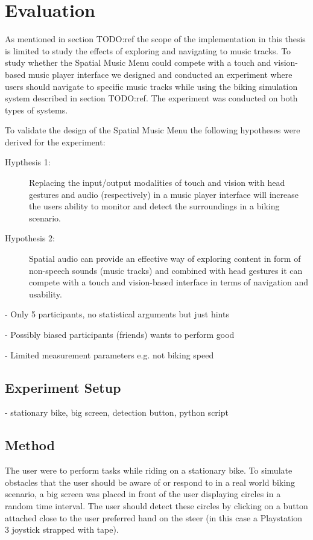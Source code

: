 \chapter{Evaluation}
As mentioned in section TODO:ref the scope of the implementation in this thesis is limited to study the effects of exploring and navigating to music tracks. To study whether the Spatial Music Menu could compete with a touch and vision-based music player interface we designed and conducted an experiment where users should navigate to specific music tracks while using the biking simulation system described in section TODO:ref. The experiment was conducted on both types of systems.

To validate the design of the Spatial Music Menu the following hypotheses were derived for the experiment:

\begin{description}
\item[Hypthesis 1:] Replacing the input/output modalities of touch and vision with head gestures and audio (respectively) in a music player interface will increase the users ability to monitor and detect the surroundings in a biking scenario.
\end{description}

\begin{description}
\item[Hypothesis 2:] Spatial audio can provide an effective way of exploring content in form of non-speech sounds (music tracks) and combined with head gestures it can compete with a touch and vision-based interface in terms of navigation and usability.
\end{description}



- Only 5 participants, no statistical arguments but just hints

- Possibly biased participants (friends) wants to perform good

- Limited measurement parameters e.g. not biking speed


\section{Experiment Setup}
- stationary bike, big screen, detection button, python script


\section{Method}
The user were to perform tasks while riding on a stationary bike. To simulate obstacles that the user should be aware of or respond to in a real world biking scenario, a big screen was placed in front of the user displaying circles in a random time interval. The user should detect these circles by clicking on a button attached close to the user preferred hand on the steer (in this case a Playstation 3 joystick strapped with tape).


